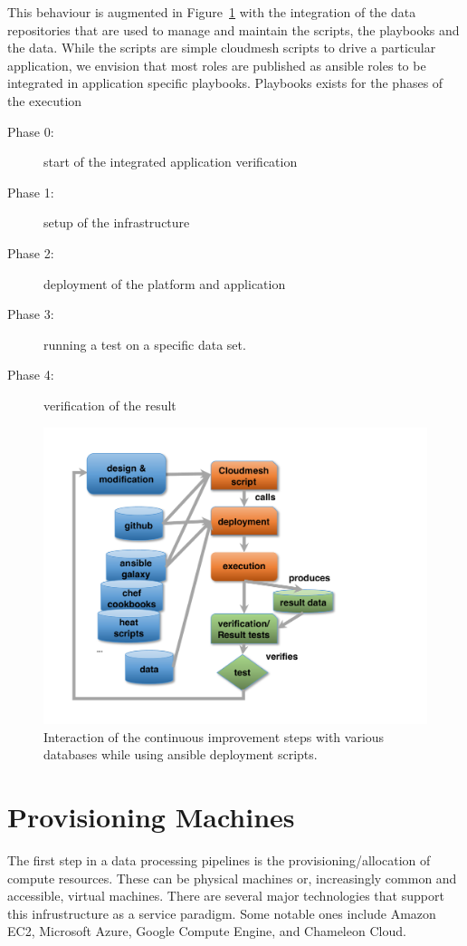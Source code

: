 \documentclass[9pt,twocolumn,twoside]{styles/osajnl}
\begin{document}
This behaviour is augmented in Figure~\ref{F:NIST-devops-2} with the integration of the
data repositories that are used to manage and maintain the scripts,
the playbooks and the data. While the scripts are simple cloudmesh
scripts to drive a particular application, we envision that most roles
are published as ansible roles to be integrated in application
specific playbooks. Playbooks exists for the phases of the execution

\begin{description}
\item[Phase 0:] start of the integrated application verification
\item[Phase 1:] setup of the infrastructure 
\item[Phase 2:] deployment of the platform and application
\item[Phase 3:] running a test on a specific data set.
\item[Phase 4:] verification of the result
\end{description}


\begin{figure}
  \centering
      \includegraphics[width=0.8\columnwidth]{images/nist-devops-2.pdf}
  \caption{Interaction of the continuous improvement steps with
    various databases while using ansible deployment scripts.}
  \label{F:NIST-devops-2}
\end{figure}




\section{Provisioning Machines}



The first step in a data processing pipelines is the
provisioning/allocation of compute resources. These can be physical
machines or, increasingly common and accessible, virtual
machines. There are several major technologies that support this
infrustructure as a service paradigm. Some notable ones include Amazon
EC2, Microsoft Azure, Google Compute Engine, and Chameleon Cloud.
\end{document}
